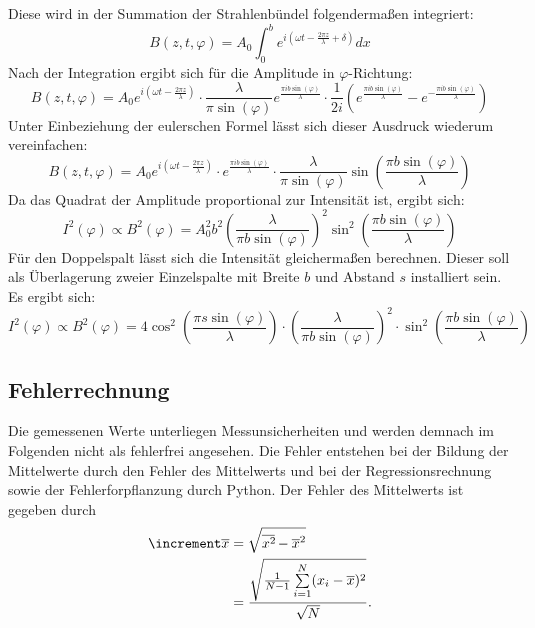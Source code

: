 \noindent Diese wird in der Summation der Strahlenbündel folgendermaßen integriert:
\begin{equation}
    \label{eqn:4}
    B(z,t,\varphi) = A_0 \int_0^b e^{i\left(\omega t - \frac{2 \pi z}{\lambda}
    + \delta\right)} dx
\end{equation}
\noindent Nach der Integration ergibt sich für die Amplitude in $\varphi$-Richtung:
\begin{equation}
    \label{eqn:5}
    B(z,t,\varphi) = A_0 e^{i\left(\omega t - \frac{2 \pi z}{\lambda}\right)}
    \cdot \frac{\lambda}{\pi \sin(\varphi)} e^{\frac{\pi i b \sin(\varphi)}{\lambda}}
    \cdot \frac{1}{2i} \left(e^{\frac{\pi i b \sin(\varphi)}{\lambda}}
    -e^{-\frac{\pi i b \sin(\varphi)}{\lambda}}\right)
\end{equation}
\noindent Unter Einbeziehung der eulerschen Formel lässt sich dieser Ausdruck
wiederum vereinfachen:
\begin{equation}
    \label{eqn:6}
    B(z,t,\varphi) = A_0 e^{i\left(\omega t - \frac{2 \pi z}{\lambda}\right)}
    \cdot e^{\frac{\pi i b \sin(\varphi)}{\lambda}} \cdot \frac{\lambda}{\pi \sin(\varphi)}
    \sin\left(\frac{\pi b \sin(\varphi)}{\lambda}\right)
\end{equation}
\noindent Da das Quadrat der Amplitude proportional zur Intensität ist, ergibt 
sich:
\begin{equation}
    \label{eqn:7}
    I^2 (\varphi) \propto B^2 (\varphi) = A_0^2 b^2 \left(\frac{\lambda}
    {\pi b \sin(\varphi)}\right)^2 \sin^2 \left(\frac{\pi b \sin(\varphi)}
    {\lambda}\right)
\end{equation}
Für den Doppelspalt lässt sich die Intensität gleichermaßen berechnen. Dieser 
soll als Überlagerung zweier Einzelspalte mit Breite $b$ und Abstand $s$ 
installiert sein. Es ergibt sich:
\begin{equation}
    \label{eqn:8}
    I^2 (\varphi) \propto B^2 (\varphi) = 4 \cos^2 \left(\frac{\pi s \sin(\varphi)}
    {\lambda}\right) \cdot \left(\frac{\lambda}{\pi b \sin(\varphi)}\right)^2
    \cdot \sin^2\left(\frac{\pi b \sin(\varphi)}{\lambda}\right)
\end{equation}

\subsection{Fehlerrechnung}
Die gemessenen Werte unterliegen Messunsicherheiten und werden demnach im
Folgenden nicht als fehlerfrei angesehen. Die Fehler entstehen bei der
Bildung der Mittelwerte durch den Fehler des Mittelwerts und bei der
Regressionsrechnung sowie der Fehlerforpflanzung durch Python.
Der Fehler des Mittelwerts ist gegeben durch 
\begin{equation}
    \begin{aligned}
        \increment \overline{x} &= \sqrt{\overline{x^2\kern-0.1em} - \overline{x}^2} \\
                            &= \frac{\sqrt{\frac{1}{N-1} \sum\limits_{i=1}^N (x_i - \overline{x})^2}}{\sqrt{N}}.
    \end{aligned}
\end{equation}

